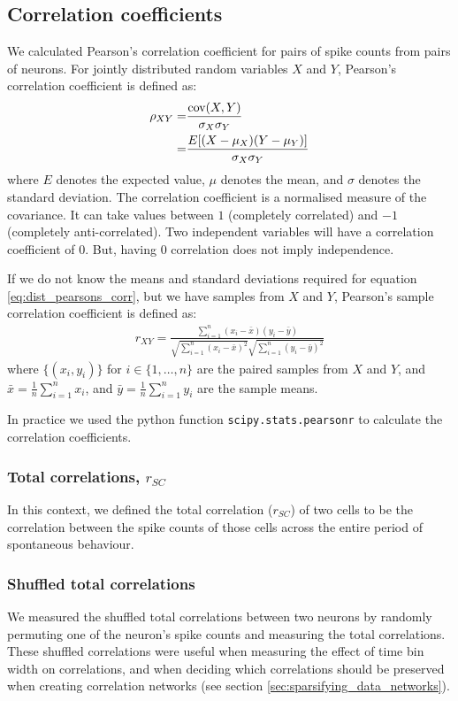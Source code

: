     \subsection{Correlation coefficients}
    We calculated Pearson's correlation coefficient for pairs of spike counts from pairs of neurons. For jointly distributed random variables $X$ and $Y$, Pearson's correlation coefficient is defined as:
    \begin{align}\label{eq:dist_pearsons_corr}
        \rho_{XY} =& \frac{\text{cov}(X,Y)}{\sigma_X \sigma_Y} \\
                  =& \frac{E[(X - \mu_X)(Y - \mu_Y)]}{\sigma_X \sigma_Y}
    \end{align}
    where $E$ denotes the expected value, $\mu$ denotes the mean, and $\sigma$ denotes the standard deviation. The correlation coefficient is a normalised measure of the covariance. It can take values between $1$ (completely correlated) and $-1$ (completely anti-correlated). Two independent variables will have a correlation coefficient of $0$. But, having $0$ correlation does not imply independence.

    If we do not know the means and standard deviations required for equation \ref{eq:dist_pearsons_corr}, but we have samples from $X$ and $Y$, Pearson's sample correlation coefficient is defined as:
    \begin{align}
        r_{XY} = \frac{\sum_{i=1}^n (x_i - \bar{x})(y_i - \bar{y})}{\sqrt{\sum_{i=1}^n (x_i - \bar{x})^2}\sqrt{\sum_{i=1}^n (y_i - \bar{y})^2}}
    \end{align}
    where $\lbrace (x_i, y_i) \rbrace$ for $i \in \lbrace 1, \dots, n \rbrace$ are the paired samples from $X$ and $Y$, and $\bar{x} = \frac{1}{n}\sum_{i=1}^n x_i$, and $\bar{y} = \frac{1}{n}\sum_{i=1}^n y_i$ are the sample means.

    In practice we used the python function \texttt{scipy.stats.pearsonr} to calculate the correlation coefficients.

        \subsubsection{Total correlations, $r_{SC}$}\label{sec:spike_count_correlation}
        In this context, we defined the total correlation ($r_{SC}$) of two cells to be the correlation between the spike counts of those cells across the entire period of spontaneous behaviour.

        \subsubsection{Shuffled total correlations}\label{sec:shuffled_correlations}
        We measured the shuffled total correlations between two neurons by randomly permuting one of the neuron's spike counts and measuring the total correlations. These shuffled correlations were useful when measuring the effect of time bin width on correlations, and when deciding which correlations should be preserved when creating correlation networks (see section \ref{sec:sparsifying_data_networks}).

